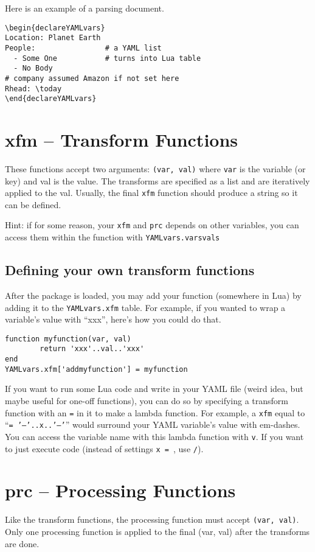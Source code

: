 \documentclass[11pt,parskip=half]{scrartcl}
\begin{document}
Here is an example of a parsing document.


\begin{verbatim}
\begin{declareYAMLvars}
Location: Planet Earth
People:                # a YAML list
  - Some One           # turns into Lua table
  - No Body
# company assumed Amazon if not set here
Rhead: \today
\end{declareYAMLvars}
\end{verbatim}


 \section{xfm -- Transform Functions}
These functions accept two arguments: \texttt{(var, val)} where \texttt{var} is the variable (or key) and val is the value.
The transforms are specified as a list and are iteratively applied to the val.
Usually, the final \texttt{xfm} function should produce a string so it can be defined.

Hint: if for some reason, your \texttt{xfm} and \texttt{prc} depends on other variables,
you can access them within the function
with \texttt{YAMLvars.varsvals}

\subsection{Defining your own transform functions}
After the package is loaded, you may add your function (somewhere in Lua)
by adding it to the \texttt{YAMLvars.xfm} table.
For example, if you wanted to wrap a variable's value with ``xxx'', here's how you could do that.
\begin{verbatim}
function myfunction(var, val)
        return 'xxx'..val..'xxx'
end
YAMLvars.xfm['addmyfunction'] = myfunction
\end{verbatim}

If you want to run some Lua code and write in your YAML file (weird idea, but maybe useful for one-off functions),
you can do so by specifying a transform function with an \texttt{=} in it to make a lambda function.
For example, a \texttt{xfm} equal to
``\texttt{= '---'..x..'---'}''
would surround your YAML variable's value with em-dashes.
You can access the variable name with this lambda function with \texttt{v}.
If you want to just execute code (instead of settings \texttt{x = }, use \texttt{/}).

  \section{prc -- Processing Functions}
Like the transform functions, the processing function must accept \texttt{(var, val)}.
Only one processing function is applied to the final (var, val) after the transforms are done.
\end{document}

